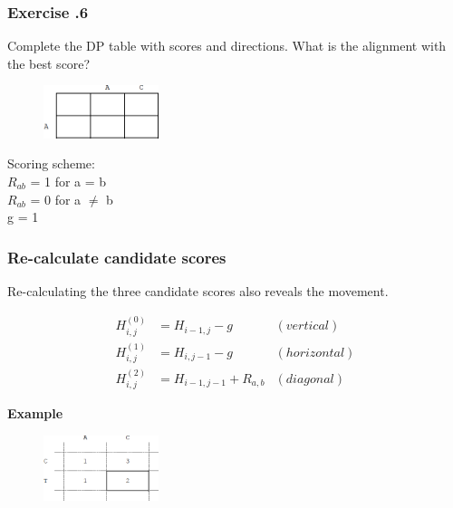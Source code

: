 %
%
\subsubsection*{Exercise \thesection.6}
	
Complete the DP table with scores and directions. What is the alignment with the best score?

\begin{multicols}{2}
\begin{figure}[H]
  \centering
      \includegraphics[width=0.3\textwidth]{fig02/back_tracking_store_moves_exercise.png}
\end{figure}

\noindent Scoring scheme: \\ 
\null \quad $R_{ab}$ = 1 for a = b \\ 
\null \quad $R_{ab}$ = 0 for a $\neq$ b \\ 
\null \quad g = 1

\end{multicols} 

%
%
\subsubsection*{Re-calculate candidate scores}

Re-calculating the three candidate scores also reveals the movement.

\begin{align*}
H_{i,j}^{(0)} &= H_{i-1,j} - g &(vertical) \\
H_{i,j}^{(1)} &= H_{i,j-1} - g &(horizontal) \\
H_{i,j}^{(2)} &= H_{i-1,j-1} + R_{a,b} &(diagonal)
\end{align*}

\noindent \textbf{Example}

\begin{figure}[H]
  \centering
      \includegraphics[width=0.3\textwidth]{fig02/back_tracking_example.png}
\end{figure}
				
